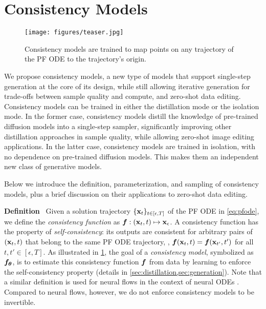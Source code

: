 \section{Consistency Models}\label{sec:consistency}


\begin{figure}[t]
    \centering
    \texttt{[image: figures/teaser.jpg]}
    \caption{{\color{model}Consistency models} are trained to map points on any trajectory of the {\color{ode}PF ODE} to the trajectory's origin.}
    \label{fig:teaser}
\end{figure}
We propose consistency models, a new type of models that support single-step generation at the core of its design, while still allowing iterative generation for trade-offs between sample quality and compute, and zero-shot data editing. Consistency models can be trained in either the distillation mode or the isolation mode. In the former case, consistency models distill the knowledge of pre-trained diffusion models into a single-step sampler, significantly improving other distillation approaches in sample quality, while allowing zero-shot image editing applications. In the latter case, consistency models are trained in isolation, with no dependence on pre-trained diffusion models. This makes them an independent new class of generative models.

Below we introduce the definition, parameterization, and sampling of consistency models, plus a brief discussion on their applications to zero-shot data editing.

\textbf{Definition}~ Given a solution trajectory $\{ {\mathbf{x}}_t \}_{t\in[\epsilon,T]}$ of the PF ODE in \cref{eq:pfode}, we define the \emph{consistency function} as ${\bm{f}}: ({\mathbf{x}}_t, t) \mapsto {\mathbf{x}}_{\epsilon}$. A consistency function has the property of \emph{self-consistency}: its outputs are consistent for arbitrary pairs of $({\mathbf{x}}_t, t)$ that belong to the same PF ODE trajectory, \ie, ${\bm{f}}({\mathbf{x}}_t, t) = {\bm{f}}({\mathbf{x}}_{t'}, t')$ for all $t, t' \in [\epsilon,T]$. %
As illustrated in \cref{fig:teaser}, the goal of a \emph{consistency model}, symbolized as ${\bm{f}}_{\bm{\theta}}$, is to estimate this consistency function ${\bm{f}}$ from data by learning to enforce the self-consistency property (details in \cref{sec:distillation,sec:generation}). Note that a similar definition is used for neural flows \cite{bilovs2021neural} in the context of neural ODEs \cite{chen2018neural}. Compared to neural flows, however, we do not enforce consistency models to be invertible.

